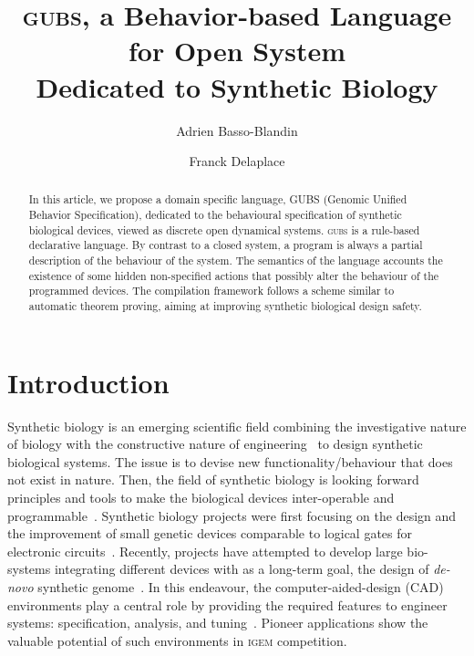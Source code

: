 \documentclass{eptcs}
\title{ \textsc{gubs}, a Behavior-based Language for Open System \\
Dedicated to Synthetic Biology}
\author{Adrien Basso-Blandin
\institute{IBISC lab. }
 \institute{Evry University}
\email{abasso@ibisc.univ-evry.fr}
\and 
 Franck Delaplace
\institute{IBISC lab.}
 \institute{Evry University}
\email{franck.delaplace@ibisc.univ-evry.fr}}
\newcounter{ti}
\begin{document}
\maketitle

\begin{abstract}
In this article, we propose a domain specific language, GUBS (Genomic Unified Behavior Specification), dedicated to the behavioural specification of synthetic biological devices, viewed as discrete open dynamical systems. \textsc{gubs} is a rule-based declarative language. By contrast to a closed system, a program is always a partial description of the behaviour of the system. The semantics of the language accounts the existence of some hidden non-specified actions that possibly alter the behaviour of the programmed devices.
The compilation framework follows a scheme similar to automatic theorem proving, aiming at improving synthetic biological design safety.



\end{abstract}
\section{Introduction}


Synthetic biology is an emerging scientific field combining the investigative nature of biology with the constructive nature of engineering~\cite{Purnick2009} to design synthetic biological systems. The issue is to devise new functionality/behaviour that does not exist in nature.
Then, the field of synthetic biology is looking forward principles and tools to make the biological devices inter-operable and programmable~\cite{Lu2009}. Synthetic biology projects were first focusing on the design and the improvement of small genetic devices comparable to logical gates for electronic circuits~\cite{Regot2010,Clancy2010}. Recently, projects have attempted to develop large bio-systems integrating different devices with as a long-term goal, the design of \textit{de-novo} synthetic genome~\cite{Gibson2010}. In this endeavour, the computer-aided-design (CAD) environments play a central role by providing the required features to engineer systems: specification, analysis, and tuning~\cite{Bilitchenko2011,Pedersen2009a, Umesh2010, Czar2009}. Pioneer applications show the valuable potential of such environments in \textsc{igem} competition. 
\end{document}
